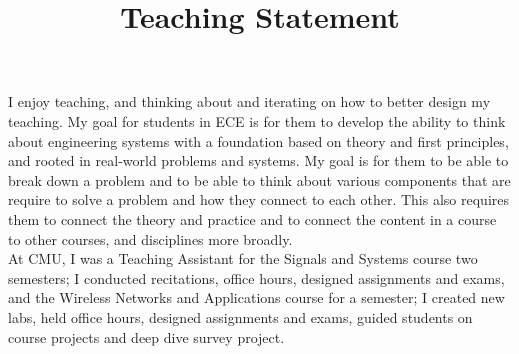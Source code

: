 \documentclass[10pt]{article}
\date{}
\begin{document}


\title{{\Large Teaching Statement}}
\vspace{-1em}
\maketitle

\vspace{-6em}


I enjoy teaching, and thinking about and iterating on how to better design my teaching.  My goal for students in ECE is for them to develop the ability to think about engineering systems with a foundation based on theory and first principles, and rooted in real-world problems and systems. My goal is for them to be able to break down a problem and to be able to think about various components that are require to solve a problem and how they connect to each other. This also requires them to connect the theory and practice and to connect the content in a course to other courses, and disciplines more broadly. \\

At CMU, I was a Teaching Assistant for the Signals and Systems course two semesters; I conducted recitations, office hours, designed assignments and exams, and the Wireless Networks and Applications course for a semester; I created new labs, held office hours, designed assignments and exams, guided students on course projects and deep dive survey project.\\
\end{document}
